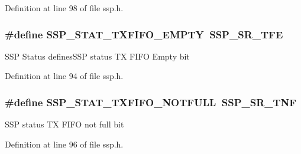 Definition at line 98 of file ssp.\+h.

\subsubsection[{\texorpdfstring{S\+S\+P\+\_\+\+S\+T\+A\+T\+\_\+\+T\+X\+F\+I\+F\+O\+\_\+\+E\+M\+P\+TY}{SSP_STAT_TXFIFO_EMPTY}}]{\setlength{\rightskip}{0pt plus 5cm}\#define S\+S\+P\+\_\+\+S\+T\+A\+T\+\_\+\+T\+X\+F\+I\+F\+O\+\_\+\+E\+M\+P\+TY~{\bf S\+S\+P\+\_\+\+S\+R\+\_\+\+T\+FE}}\hypertarget{group___s_s_p___public___macros_gadb3e00bb8249856e4ace28ea931bb177}{}\label{group___s_s_p___public___macros_gadb3e00bb8249856e4ace28ea931bb177}
S\+SP Status defines\+S\+SP status TX F\+I\+FO Empty bit 

Definition at line 94 of file ssp.\+h.

\subsubsection[{\texorpdfstring{S\+S\+P\+\_\+\+S\+T\+A\+T\+\_\+\+T\+X\+F\+I\+F\+O\+\_\+\+N\+O\+T\+F\+U\+LL}{SSP_STAT_TXFIFO_NOTFULL}}]{\setlength{\rightskip}{0pt plus 5cm}\#define S\+S\+P\+\_\+\+S\+T\+A\+T\+\_\+\+T\+X\+F\+I\+F\+O\+\_\+\+N\+O\+T\+F\+U\+LL~{\bf S\+S\+P\+\_\+\+S\+R\+\_\+\+T\+NF}}\hypertarget{group___s_s_p___public___macros_ga9a88c97aaba7a01be0842d099cf7958c}{}\label{group___s_s_p___public___macros_ga9a88c97aaba7a01be0842d099cf7958c}
S\+SP status TX F\+I\+FO not full bit 

Definition at line 96 of file ssp.\+h.

